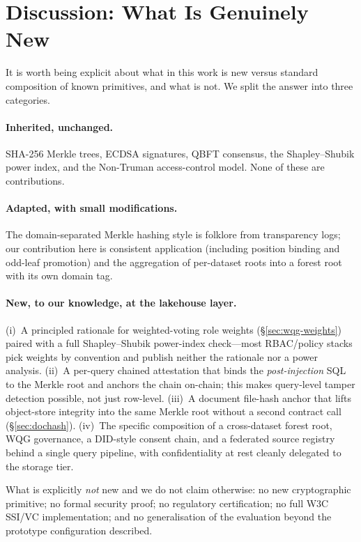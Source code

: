 \documentclass[10pt,twocolumn]{article}
\begin{document}
\section{Discussion: What Is Genuinely New}
\label{sec:discussion}

It is worth being explicit about what in this work is new versus
standard composition of known primitives, and what is not. We
split the answer into three categories.

\paragraph{Inherited, unchanged.}
SHA-256 Merkle trees, ECDSA signatures, QBFT consensus, the
Shapley--Shubik power index, and the Non-Truman access-control
model. None of these are contributions.

\paragraph{Adapted, with small modifications.}
The domain-separated Merkle hashing style is folklore from
transparency logs; our contribution here is consistent application
(including position binding and odd-leaf promotion) and the
aggregation of per-dataset roots into a forest root with its own
domain tag.

\paragraph{New, to our knowledge, at the lakehouse layer.}
(i)~A principled rationale for weighted-voting role weights
(\S\ref{sec:wqg-weights}) paired with a full Shapley--Shubik
power-index check---most RBAC/policy stacks pick weights by
convention and publish neither the rationale nor a power analysis.
(ii)~A per-query chained attestation that binds the
\emph{post-injection} SQL to the Merkle root and anchors the
chain on-chain; this makes query-level tamper detection possible,
not just row-level.
(iii)~A document file-hash anchor that lifts object-store
integrity into the same Merkle root without a second contract
call (\S\ref{sec:dochash}).
(iv)~The specific composition of a cross-dataset forest root,
WQG governance, a DID-style consent chain, and a federated source
registry behind a single query pipeline, with confidentiality at
rest cleanly delegated to the storage tier.

What is explicitly \emph{not} new and we do not claim otherwise:
no new cryptographic primitive; no formal security proof; no
regulatory certification; no full W3C SSI/VC implementation; and
no generalisation of the evaluation beyond the prototype
configuration described.
\end{document}
